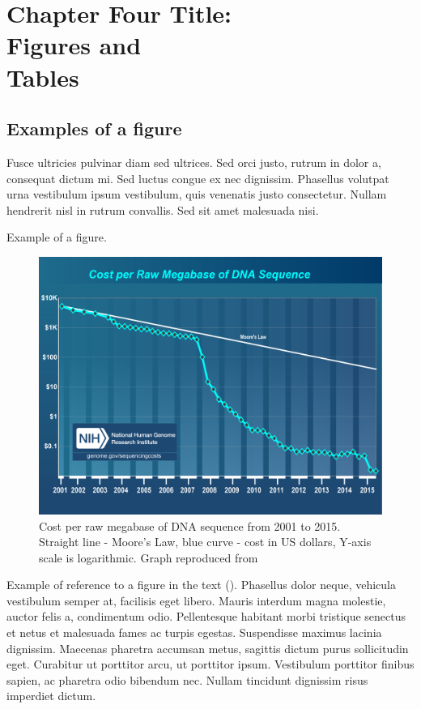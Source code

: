 \chapter[Chapter Four Title: Figures and Tables]{Chapter Four Title:\\ Figures and\\ Tables}
\section{Examples of a figure}
Fusce ultricies pulvinar diam sed ultrices. Sed orci justo, rutrum in dolor a, consequat dictum mi. Sed luctus congue ex nec dignissim. Phasellus volutpat urna vestibulum ipsum vestibulum, quis venenatis justo consectetur. Nullam hendrerit nisl in rutrum convallis. Sed sit amet malesuada nisi.

Example of a figure.
\begin{figure}[ht!]
\begin{center}
\includegraphics[scale=0.5]{costperMb2015_4.jpg}
\end{center}
\caption[Cost per raw megabase of DNA sequence from 2001 to 2015]{Cost per raw megabase of DNA sequence from 2001 to 2015. Straight line - Moore's Law, blue curve - cost in US dollars, Y-axis scale is logarithmic. Graph reproduced from \citep{wetterstrand2016}}
\label{fig_dna_cost}
\end{figure}
Example of reference to a figure in the text (). Phasellus dolor neque, vehicula vestibulum semper at, facilisis eget libero. Mauris interdum magna molestie, auctor felis a, condimentum odio. Pellentesque habitant morbi tristique senectus et netus et malesuada fames ac turpis egestas. Suspendisse maximus lacinia dignissim. Maecenas pharetra accumsan metus, sagittis dictum purus sollicitudin eget. Curabitur ut porttitor arcu, ut porttitor ipsum. Vestibulum porttitor finibus sapien, ac pharetra odio bibendum nec. Nullam tincidunt dignissim risus imperdiet dictum.


